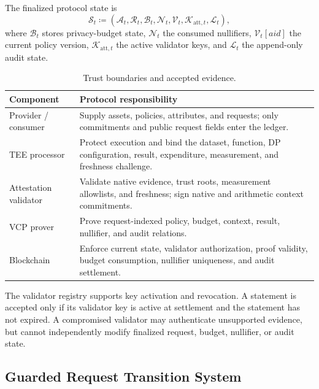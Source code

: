 \documentclass[10pt,journal,compsoc]{IEEEtran}
\begin{document}
The finalized protocol state is
\begin{equation}
\mathcal{S}_t\coloneqq
(\mathcal{A}_t,\mathcal{R}_t,\mathcal{B}_t,\mathcal{N}_t,
\mathcal{V}_t,\mathcal{K}_{\mathrm{att},t},\mathcal{L}_t),
\label{eq:global_protocol_state}
\end{equation}
where $\mathcal{B}_t$ stores privacy-budget state, $\mathcal{N}_t$ the consumed nullifiers, $\mathcal{V}_t[aid]$ the current policy version, $\mathcal{K}_{\mathrm{att},t}$ the active validator keys, and $\mathcal{L}_t$ the append-only audit state.

\begin{table}[!t]
\centering
\caption{Trust boundaries and accepted evidence.}
\label{tab:trust_boundaries}
\begin{tabular}{@{}
>{\raggedright\arraybackslash}m{}
>{\raggedright\arraybackslash}m{}@{}}
\toprule
\textbf{Component} & \textbf{Protocol responsibility} \\
\midrule
Provider / consumer &
Supply assets, policies, attributes, and requests; only commitments and public request fields enter the ledger. \\
TEE processor &
Protect execution and bind the dataset, function, DP configuration, result, expenditure, measurement, and freshness challenge. \\
Attestation validator &
Validate native evidence, trust roots, measurement allowlists, and freshness; sign native and arithmetic context commitments. \\
VCP prover &
Prove request-indexed policy, budget, context, result, nullifier, and audit relations. \\
Blockchain &
Enforce current state, validator authorization, proof validity, budget consumption, nullifier uniqueness, and audit settlement. \\
\bottomrule
\end{tabular}
\end{table}

The validator registry supports key activation and revocation. A statement is accepted only if its validator key is active at
settlement and the statement has not expired. A compromised validator may authenticate unsupported evidence, but cannot independently modify finalized request, budget, nullifier, or audit state.

\subsection{Guarded Request Transition System}
\label{subsec:lifecycle}
\end{document}
